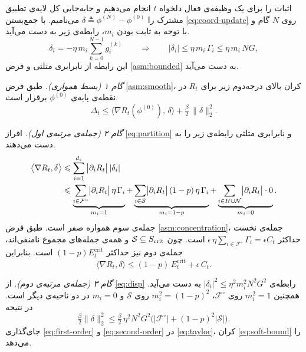 \begin{trivlist}
	\item[\hskip\labelsep{\em اثبات.}]
	اثبات را برای یک وظیفه‌ی فعال دلخواه $t$ انجام می‌دهیم و جابه‌جایی کل لایه‌ی تطبیق مشترک را $\delta\triangleq\phi^{(N)}-\phi^{(0)}$ می‌نامیم. با جمع‌بستن \eqref{eq:coord-update} روی $N$ گام و با توجه به ثابت بودن $m_i$، رابطه‌ی زیر به دست می‌آید.
	\begin{equation}
		\label{eq:disp}
		\delta_i = -\eta\,m_i\sum_{k=0}^{N-1}g^{(k)}_i
		\qquad\Longrightarrow\qquad
		|\delta_i|\leq\eta\,m_i\,\Gamma_i\leq\eta\,m_i\,NG,
	\end{equation}
	این رابطه از نابرابری مثلثی و فرض \ref{asm:bounded} به دست می‌آید.

	\textit{گام ۱ (بسط همواری).} طبق فرض \ref{asm:smooth}، کران بالای درجه‌دوم زیر برای $R_t$ در نقطه‌ی پایه‌ی $\phi^{(0)}$ برقرار است.
	\begin{equation}
		\label{eq:taylor}
		\Delta_t \leq \big\langle\nabla R_t(\phi^{(0)}),\,\delta\big\rangle + \tfrac{\beta}{2}\,\|\delta\|_2^2 .
	\end{equation}

	\textit{گام ۲ (جمله‌ی مرتبه‌ی اول).} افراز \eqref{eq:partition} و نابرابری مثلثی رابطه‌ی زیر را به دست می‌دهند.
	\begin{align}
		\big\langle\nabla R_t,\delta\big\rangle
		&\leq \sum_{i=1}^{d_s}\big|\partial_i R_t\big|\,|\delta_i| \notag\\
		&\leq \underbrace{\sum_{i\in\mathcal{F}^{\circ}}\!\big|\partial_i R_t\big|\,\eta\,\Gamma_i}_{m_i=1}
		+ \underbrace{\sum_{i\in\mathcal{S}}\!\big|\partial_i R_t\big|\,(1-p)\,\eta\,\Gamma_i}_{m_i=1-p}
		+ \underbrace{\sum_{i\in H\cup\mathcal{N}}\!\big|\partial_i R_t\big|\cdot 0}_{m_i=0}.
		\label{eq:three-sums}
	\end{align}
	جمله‌ی سوم همواره صفر است. طبق فرض \ref{asm:concentration}، جمله‌ی نخست حداکثر $\epsilon\,\eta\sum_{i\in\mathcal{F}^{\circ}}\Gamma_i=\epsilon C_t$ است. چون $\mathcal{S}\subseteq\Scrit$ و همه‌ی جمله‌های مجموع نامنفی‌اند، جمله‌ی دوم نیز حداکثر $(1-p)E^{\mathrm{crit}}_t$ است. بنابراین
	\begin{equation}
		\label{eq:first-order}
		\big\langle\nabla R_t,\delta\big\rangle \leq (1-p)\,E^{\mathrm{crit}}_t + \epsilon\,C_t .
	\end{equation}

	\textit{گام ۳ (جمله‌ی مرتبه‌ی دوم).} از \eqref{eq:disp} رابطه‌ی $|\delta_i|^2\leq\eta^2 m_i^2 N^2 G^2$ به دست می‌آید. همچنین $m_i^2=1$ روی $\mathcal{F}^{\circ}$، $m_i^2=(1-p)^2$ روی $\mathcal{S}$ و $m_i=0$ در دو ناحیه‌ی دیگر است. در نتیجه
	\begin{equation}
		\label{eq:second-order}
		\tfrac{\beta}{2}\|\delta\|_2^2 \leq \tfrac{\beta}{2}\,\eta^2 N^2 G^2\Big(|\mathcal{F}^{\circ}| + (1-p)^2|\mathcal{S}|\Big).
	\end{equation}
	جای‌گذاری \eqref{eq:first-order} و \eqref{eq:second-order} در \eqref{eq:taylor}، کران \eqref{eq:soft-bound} را می‌دهد.


\end{trivlist}

